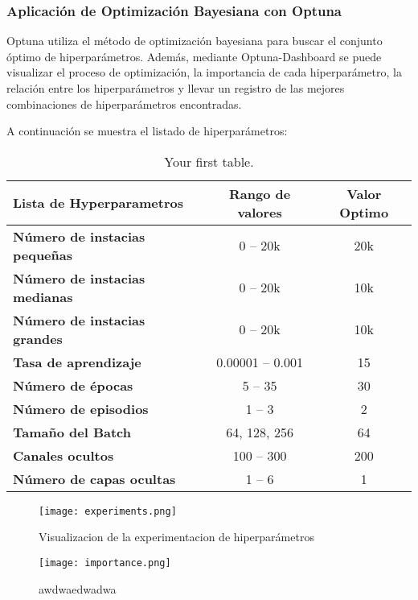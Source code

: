 \subsubsection{Aplicación de Optimización Bayesiana con Optuna}
Optuna utiliza el método de optimización bayesiana para buscar el conjunto óptimo de
hiperparámetros. Además, mediante Optuna-Dashboard se puede visualizar el proceso de
optimización, la importancia de cada hiperparámetro, la relación entre los hiperparámetros
y llevar un registro de las mejores combinaciones de hiperparámetros encontradas.\medskip

A continuación se muestra el listado de hiperparámetros:

\begin{table}[ht]
    \centering
    \begin{tabular}[ht]{l|c|c} 
        \textbf{Lista de Hyperparametros} & \textbf{Rango de valores} & \textbf{Valor Optimo}\\
        \hline
        \textbf{Número de instacias pequeñas} & 0 -- 20k & 20k\\
        \textbf{Número de instacias medianas} & 0 -- 20k & 10k\\
        \textbf{Número de instacias grandes}  & 0 -- 20k & 10k \\
        \textbf{Tasa de aprendizaje} & 0.00001 -- 0.001 & 15 \\
        \textbf{Número de épocas} & 5 -- 35 & 30 \\ 
        \textbf{Número de episodios} & 1 -- 3 & 2 \\
        \textbf{Tamaño del Batch} & 64, 128, 256 & 64\\
        \textbf{Canales ocultos} & 100 -- 300 & 200 \\
        \textbf{Número de capas ocultas} & 1 -- 6 & 1 \\
    \end{tabular}
    \caption{Your first table.}
    \label{tab:hyperparams}
\end{table}

\begin{figure}[ht]
    \centering
    \texttt{[image: experiments.png]}
    \caption{Visualizacion de la experimentacion de hiperparámetros}
    \label{fig:experiments}
\end{figure}

\begin{figure}[h!]
    \centering
    \texttt{[image: importance.png]}
    \caption{awdwaedwadwa}
    \label{fig:importance}
\end{figure}
